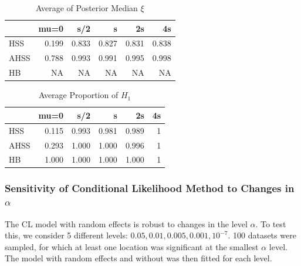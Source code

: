 \documentclass[AMA,STIX1COL]{WileyNJD-v2}\usepackage[]{graphicx}\usepackage[]{color}
\newenvironment{knitrout}{}{} %
\begin{document}
\begin{knitrout}
\color{fgcolor}\begin{table}

\caption{\label{tab:unnamed-chunk-23}Average of Posterior Median $\xi$}
\centering
\begin{tabular}[t]{l|r|r|r|r|r}
\hline
  & mu=0 & s/2 & s & 2s & 4s\\
\hline
HSS & 0.199 & 0.833 & 0.827 & 0.831 & 0.838\\
\hline
AHSS & 0.788 & 0.993 & 0.991 & 0.995 & 0.998\\
\hline
HB & NA & NA & NA & NA & NA\\
\hline
\end{tabular}
\end{table}


\end{knitrout}

\begin{knitrout}
\color{fgcolor}\begin{table}

\caption{\label{tab:unnamed-chunk-24}Average Proportion of $H_1$}
\centering
\begin{tabular}[t]{l|r|r|r|r|r}
\hline
  & mu=0 & s/2 & s & 2s & 4s\\
\hline
HSS & 0.115 & 0.993 & 0.981 & 0.989 & 1\\
\hline
AHSS & 0.293 & 1.000 & 1.000 & 0.996 & 1\\
\hline
HB & 1.000 & 1.000 & 1.000 & 1.000 & 1\\
\hline
\end{tabular}
\end{table}


\end{knitrout}


\subsubsection{Sensitivity of Conditional Likelihood Method to Changes in $\alpha$}

The CL model with random effects is robust to changes in the level $\alpha$. To test this, we consider 5 different levels: $0.05, 0.01, 0.005, 0.001, 10^{-7}$. 100 datasets were sampled, for which at least one location was significant at the smallest $\alpha$ level. The model with random effects and without was then fitted for each level. 
\end{document}
